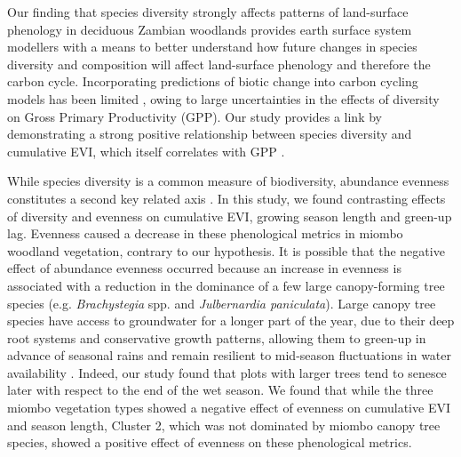 \begin{refsection}
Our finding that species diversity strongly affects patterns of land-surface phenology in deciduous Zambian woodlands provides earth surface system modellers with a means to better understand how future changes in species diversity and composition will affect land-surface phenology and therefore the carbon cycle. Incorporating predictions of biotic change into carbon cycling models has been limited \citep{Ahlstrom2015, Bodegom2011}, owing to large uncertainties in the effects of diversity on Gross Primary Productivity (GPP). Our study provides a link by demonstrating a strong positive relationship between species diversity and cumulative EVI, which itself correlates with GPP \citep{Sjostrom2011}.

While species diversity is a common measure of biodiversity, abundance evenness constitutes a second key related axis \citep{Wilsey2005, Hillebrand2008, Jost2010}. In this study, we found contrasting effects of diversity and evenness on cumulative EVI, growing season length and green-up lag. Evenness caused a decrease in these phenological metrics in miombo woodland vegetation, contrary to our hypothesis. It is possible that the negative effect of abundance evenness occurred because an increase in evenness is associated with a reduction in the dominance of a few large canopy-forming tree species (e.g. \textit{Brachystegia} spp. and \textit{Julbernardia paniculata}). Large canopy tree species have access to groundwater for a longer part of the year, due to their deep root systems and conservative growth patterns, allowing them to green-up in advance of seasonal rains and remain resilient to mid-season fluctuations in water availability \citep{Zhou2020}. Indeed, our study found that plots with larger trees tend to senesce later with respect to the end of the wet season. We found that while the three miombo vegetation types showed a negative effect of evenness on cumulative EVI and season length, Cluster 2, which was not dominated by miombo canopy tree species, showed a positive effect of evenness on these phenological metrics. 


\end{refsection}
